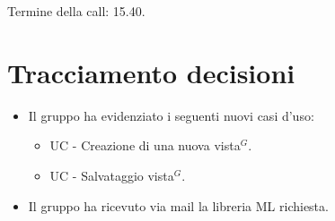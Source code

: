 Termine della call: 15.40.

\section{Tracciamento decisioni}

\begin{itemize}
	\item Il gruppo ha evidenziato i seguenti nuovi casi d'uso:
	\begin{itemize}
		\item UC - Creazione di una nuova vista$^{G}$.
		\item UC - Salvataggio vista$^{G}$.
	\end{itemize}
	\item Il gruppo ha ricevuto via mail la libreria ML richiesta.
\end{itemize}